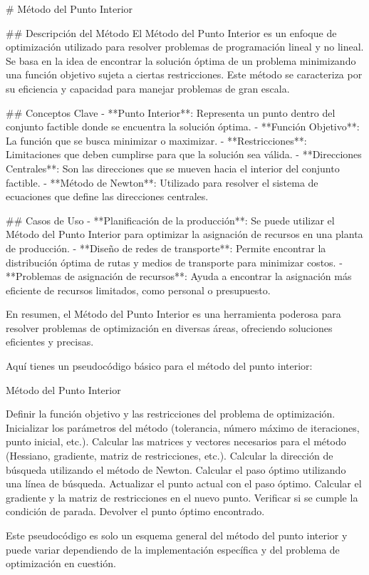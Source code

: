 \documentclass{article}
\begin{document}
# Método del Punto Interior

## Descripción del Método
El Método del Punto Interior es un enfoque de optimización utilizado para resolver problemas de programación lineal y no lineal. Se basa en la idea de encontrar la solución óptima de un problema minimizando una función objetivo sujeta a ciertas restricciones. Este método se caracteriza por su eficiencia y capacidad para manejar problemas de gran escala.

## Conceptos Clave
- **Punto Interior**: Representa un punto dentro del conjunto factible donde se encuentra la solución óptima.
- **Función Objetivo**: La función que se busca minimizar o maximizar.
- **Restricciones**: Limitaciones que deben cumplirse para que la solución sea válida.
- **Direcciones Centrales**: Son las direcciones que se mueven hacia el interior del conjunto factible.
- **Método de Newton**: Utilizado para resolver el sistema de ecuaciones que define las direcciones centrales.

## Casos de Uso
- **Planificación de la producción**: Se puede utilizar el Método del Punto Interior para optimizar la asignación de recursos en una planta de producción.
- **Diseño de redes de transporte**: Permite encontrar la distribución óptima de rutas y medios de transporte para minimizar costos.
- **Problemas de asignación de recursos**: Ayuda a encontrar la asignación más eficiente de recursos limitados, como personal o presupuesto.

En resumen, el Método del Punto Interior es una herramienta poderosa para resolver problemas de optimización en diversas áreas, ofreciendo soluciones eficientes y precisas.

Aquí tienes un pseudocódigo básico para el método del punto interior:

\begin{algorithm}
\caption{Método del Punto Interior}
\begin{algorithmic}
\State Definir la función objetivo y las restricciones del problema de optimización.
\State Inicializar los parámetros del método (tolerancia, número máximo de iteraciones, punto inicial, etc.).
\State Calcular las matrices y vectores necesarios para el método (Hessiano, gradiente, matriz de restricciones, etc.).
   \State Calcular la dirección de búsqueda utilizando el método de Newton.
   \State Calcular el paso óptimo utilizando una línea de búsqueda.
   \State Actualizar el punto actual con el paso óptimo.
   \State Calcular el gradiente y la matriz de restricciones en el nuevo punto.
   \State Verificar si se cumple la condición de parada.
\EndWhile
\State Devolver el punto óptimo encontrado.
\end{algorithmic}
\end{algorithm}

Este pseudocódigo es solo un esquema general del método del punto interior y puede variar dependiendo de la implementación específica y del problema de optimización en cuestión.
\end{document}
